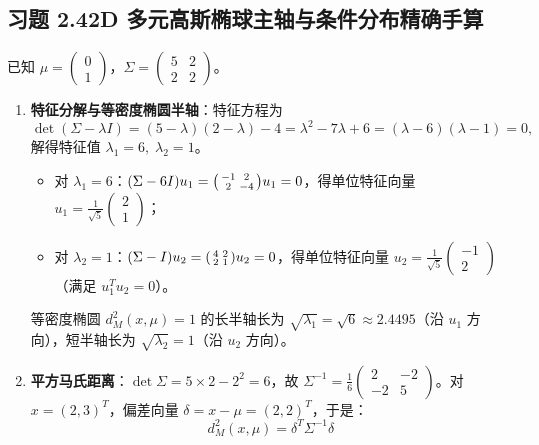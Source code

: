 \subsection*{习题 2.4\quad 2D 多元高斯椭球主轴与条件分布精确手算}
已知 $\mu = \begin{pmatrix} 0 \\ 1 \end{pmatrix}$，$\Sigma = \begin{pmatrix} 5 & 2 \\ 2 & 2 \end{pmatrix}$。
\begin{enumerate}[label=(\arabic*), leftmargin=1.8em]
  \item \textbf{特征分解与等密度椭圆半轴}：特征方程为
  \[
    \det(\Sigma - \lambda I) = (5 - \lambda)(2 - \lambda) - 4 = \lambda^2 - 7\lambda + 6 = (\lambda - 6)(\lambda - 1) = 0,
  \]
  解得特征值 $\lambda_1 = 6,\; \lambda_2 = 1$。
  \begin{itemize}
    \item 对 $\lambda_1 = 6$：$(\Sigma - 6I)u_1 = \begin{psmallmatrix} -1 & 2 \\ 2 & -4 \end{psmallmatrix}u_1 = 0$，得单位特征向量 $u_1 = \frac{1}{\sqrt{5}}\begin{pmatrix} 2 \\ 1 \end{pmatrix}$；
    \item 对 $\lambda_2 = 1$：$(\Sigma - I)u_2 = \begin{psmallmatrix} 4 & 2 \\ 2 & 1 \end{psmallmatrix}u_2 = 0$，得单位特征向量 $u_2 = \frac{1}{\sqrt{5}}\begin{pmatrix} -1 \\ 2 \end{pmatrix}$（满足 $u_1^T u_2 = 0$）。
  \end{itemize}
  等密度椭圆 $d_M^2(x, \mu) = 1$ 的长半轴长为 $\sqrt{\lambda_1} = \sqrt{6} \approx 2.4495$（沿 $u_1$ 方向），短半轴长为 $\sqrt{\lambda_2} = 1$（沿 $u_2$ 方向）。
  \item \textbf{平方马氏距离}：$\det\Sigma = 5\times 2 - 2^2 = 6$，故 $\Sigma^{-1} = \frac{1}{6}\begin{pmatrix} 2 & -2 \\ -2 & 5 \end{pmatrix}$。对 $x = (2, 3)^T$，偏差向量 $\delta = x - \mu = (2, 2)^T$，于是：
  \[
    d_M^2(x, \mu) = \delta^T \Sigma^{-1} \delta
\]
\end{enumerate}
